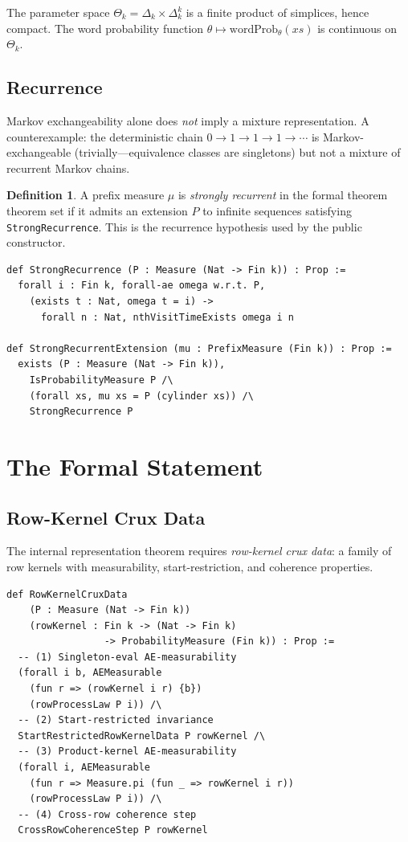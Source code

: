 \documentclass[11pt,a4paper]{article}
\theoremstyle{definition}
\newtheorem{definition}{Definition}[section]
\begin{document}
The parameter space $\Theta_k = \Delta_k \times \Delta_k^k$ is a finite product
of simplices, hence compact. The word probability function
$\theta \mapsto \mathrm{wordProb}_\theta(xs)$ is continuous on $\Theta_k$.

\subsection{Recurrence}

Markov exchangeability alone does \emph{not} imply a mixture representation.
A counterexample: the deterministic chain $0 \to 1 \to 1 \to 1 \to \cdots$
is Markov-exchangeable (trivially---equivalence classes are singletons) but
not a mixture of recurrent Markov chains.

\begin{definition}
A prefix measure $\mu$ is \emph{strongly recurrent} in the formal theorem
theorem set if it admits an extension $P$ to infinite sequences satisfying
\texttt{StrongRecurrence}. This is the recurrence hypothesis used by the
public constructor.
\end{definition}

\begin{lstlisting}
def StrongRecurrence (P : Measure (Nat -> Fin k)) : Prop :=
  forall i : Fin k, forall-ae omega w.r.t. P,
    (exists t : Nat, omega t = i) ->
      forall n : Nat, nthVisitTimeExists omega i n

def StrongRecurrentExtension (mu : PrefixMeasure (Fin k)) : Prop :=
  exists (P : Measure (Nat -> Fin k)),
    IsProbabilityMeasure P /\
    (forall xs, mu xs = P (cylinder xs)) /\
    StrongRecurrence P
\end{lstlisting}

\section{The Formal Statement}

\subsection{Row-Kernel Crux Data}

The internal representation theorem requires \emph{row-kernel crux data}:
a family of row kernels with measurability, start-restriction, and coherence
properties.

\begin{lstlisting}
def RowKernelCruxData
    (P : Measure (Nat -> Fin k))
    (rowKernel : Fin k -> (Nat -> Fin k)
                 -> ProbabilityMeasure (Fin k)) : Prop :=
  -- (1) Singleton-eval AE-measurability
  (forall i b, AEMeasurable
    (fun r => (rowKernel i r) {b})
    (rowProcessLaw P i)) /\
  -- (2) Start-restricted invariance
  StartRestrictedRowKernelData P rowKernel /\
  -- (3) Product-kernel AE-measurability
  (forall i, AEMeasurable
    (fun r => Measure.pi (fun _ => rowKernel i r))
    (rowProcessLaw P i)) /\
  -- (4) Cross-row coherence step
  CrossRowCoherenceStep P rowKernel
\end{lstlisting}
\end{document}
